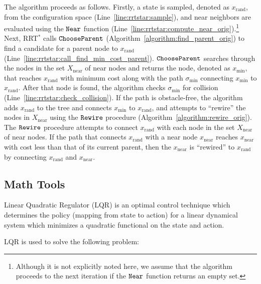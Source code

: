 \documentclass[letterpaper, 10pt, english, conference]{IEEEtran}
\begin{document}
The algorithm proceeds as follows.
Firstly, a state is sampled, denoted as
$x_\mathrm{rand}$, from the configuration space
(Line~\ref{line:rrtstar:sample}), and near neighbors are evaluated
using the ${\tt Near}$ function
(Line~\ref{line:rrtstar:compute_near_orig}).\footnote{Although it is not
  explicitly noted here,
 we assume that the algorithm proceeds to
  the next iteration if the ${\tt Near}$ function returns an empty
  set.} Next, RRT$^*$ calls ${\tt ChooseParent}$
(Algorithm~\ref{algorithm:find_parent_orig}) to find a candidate for a
parent node to $x_\mathrm{rand}$
(Line~\ref{line:rrtstar:call_find_min_cost_parent}). ${\tt
  ChooseParent}$ searches through the nodes in the set
$X_\mathrm{near}$ of near nodes and returns the node, denoted as
$x_\mathrm{min}$, that reaches $x_\mathrm{rand}$ with minimum cost
along with the path $\sigma_\mathrm{min}$ connecting
$x_\mathrm{min}$ to $x_\mathrm{rand}$. After that node
is found, the algorithm checks $\sigma_\mathrm{min}$ for collision
(Line~\ref{line:rrtstar:check_collision}). If the path
is obstacle-free,
the algorithm adds
$x_\mathrm{rand}$ to the tree and connects $x_\mathrm{min}$ to
$x_\mathrm{rand}$, and attempts to ``rewire'' the nodes in
$X_\mathrm{near}$ using the ${\tt Rewire}$ procedure
(Algorithm~\ref{algorithm:rewire_orig}). The ${\tt Rewire}$
procedure attempts to connect $x_\mathrm{rand}$ with each node in the
set $X_\mathrm{near}$ of near nodes. If the path that connects
$x_\mathrm{rand}$ with a near node $x_\mathrm{near}$ reaches
$x_\mathrm{near}$ with cost less than that of its current parent, then
the $x_\mathrm{near}$ is ``rewired'' to $x_\mathrm{rand}$ by
connecting $x_\mathrm{rand}$ and $x_\mathrm{near}$.

\subsection{Math Tools}

Linear Quadratic Regulator (LQR) is an optimal control technique which
determines the policy (mapping from state to action) for a linear
dynamical system which minimizes a quadratic functional on the state
and action.

LQR is used to solve the following problem: 
\end{document}
